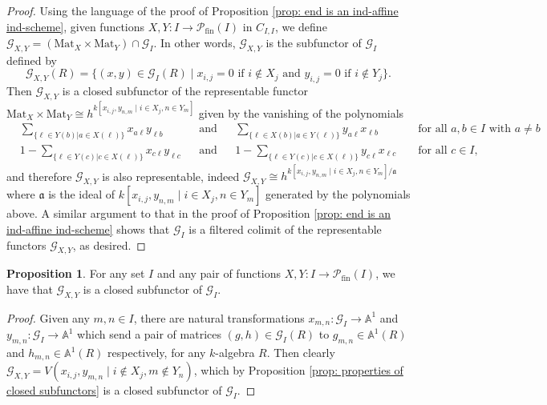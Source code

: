 \documentclass[oneside,11pt]{amsart}
\newcommand{\aaa}{\ensuremath{\mathbb{A}}}
\newcommand{\mG}{\ensuremath{\mathcal{G}}}
\newcommand{\mP}{\ensuremath{\mathcal{P}}}
\newcommand{\Mat}{\ensuremath{\text{Mat}}}
\newcommand{\fin}{\ensuremath{\text{fin}}}
\theoremstyle{definition}
\newtheorem{proof techniques}{Proof Techniques}
\newtheorem{proposition}{Proposition}
\begin{document}
\begin{proof}
Using the language of the proof of Proposition \ref{prop: end is an ind-affine ind-scheme}, given functions $X, Y: I \to \mathcal{P}_\text{fin}(I)$ in $C_{I, I}$, we define $\mG_{X , Y} = (\Mat_X \times \Mat_Y) \cap \mG_I$. In other words, $\mG_{X , Y}$ is the subfunctor of $\mG_I$ defined by 
\begin{equation*}
\mG_{X , Y}(R) = \{ (x ,  y) \in \mG_{I}(R) \mid x_{i, j} = 0 \text{ if } i \notin X_j \text{ and } y_{i, j} = 0 \text{ if } i \notin Y_j \}.
\end{equation*}
Then $\mG_{X , Y}$ is a closed subfunctor of the representable functor $\Mat_X \times \Mat_Y \cong h^{k[x_{i , j} , y_{n , m} \mid i \in X_j , n \in Y_m] }$ given by the vanishing of the polynomials
\begin{align*}
&\sum_{\{ \ell \in Y(b) | a \in X(\ell)\} } x_{a \ell} y_{\ell b} & & \text{and} & & \sum_{\{ \ell \in X(b) | a \in Y(\ell)\} } y_{a \ell} x_{\ell b} & & \text{ for all } a , b \in I \text{ with } a \neq b 
\\ &1 - \sum_{\{ \ell \in Y(c) | c \in X(\ell)\}} x_{c \ell} y_{\ell c} & & \text{and} & & 1 - \sum_{\{ \ell \in Y(c) | c \in X(\ell)\}} y_{c \ell} x_{\ell c} & & \text{ for all } c \in I,
\end{align*} 
and therefore $\mG_{X , Y}$ is also representable, indeed $\mG_{X , Y} \cong h^{k[x_{i , j} , y_{n , m} \mid i \in X_j , n \in Y_m]  / \mathfrak{a} }$ where $\mathfrak{a}$ is the ideal of $k[x_{i , j} , y_{n , m} \mid i \in X_j , n \in Y_m]$ generated by the polynomials above. A similar argument to that in the proof of Proposition \ref{prop: end is an ind-affine ind-scheme} shows that $\mG_I$ is a filtered colimit of the representable functors $\mG_{X , Y}$, as desired. 
\end{proof}



\begin{proposition}\label{prop: parts of closed subfunctor version of GL are closed in closed subfunctor version of GL}
For any set $I$ and any pair of functions $X , Y: I \to \mP_\fin(I)$, we have that $\mG_{X, Y}$ is a closed subfunctor of $\mG_I$. 
\end{proposition}

\begin{proof}
Given any $m, n \in I$, there are natural transformations $x_{m, n} : \mG_I \to \aaa^1$ and $y_{m, n} : \mG_I \to \aaa^1$ which send a pair of matrices $(g , h) \in \mG_I(R)$ to $g_{m , n} \in \aaa^1(R)$ and $h_{m , n} \in \aaa^1(R)$ respectively, for any $k$-algebra $R$. Then clearly $\mG_{X , Y} = V(x_{i , j} , y_{m, n} \mid i \notin X_j , m \notin Y_n )$, which by Proposition \ref{prop: properties of closed subfunctors} is a closed subfunctor of $\mG_I$. 
\end{proof}
\end{document}
